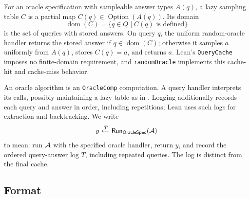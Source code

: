 \begin{definition}
\label{def:lazy_sampling_table}
\leanok
For an oracle specification with sampleable answer types \(A(q)\), a lazy sampling
table \(C\) is a partial map \(C(q)\in\operatorname{Option}(A(q))\). Its domain
\begin{equation*}
\operatorname{dom}(C)=\{q\in Q\mid C(q)\text{ is defined}\}
\end{equation*}
is the set of queries with stored answers. On query \(q\), the uniform random-oracle
handler returns the stored answer if \(q\in\operatorname{dom}(C)\); otherwise it
samples \(a\) uniformly from \(A(q)\), stores \(C(q)=a\), and returns \(a\).
Lean's \texttt{QueryCache} imposes no finite-domain requirement, and
\texttt{randomOracle} implements this cache-hit and cache-miss behavior.
\end{definition}

\begin{definition}
\label{def:oracle_run}
\leanok
An oracle algorithm is an \texttt{OracleComp} computation. A query handler
interprets its calls, possibly maintaining a lazy table as in
. Logging additionally records each query and answer
in order, including repetitions; Lean uses such logs for extraction and backtracking. We
write
\begin{equation*}
y\xleftarrow{T}\mathsf{Run}_{\mathsf{OracleSpec}}(\mathcal{A})
\end{equation*}
to mean: run \(\mathcal{A}\) with the specified oracle handler, return \(y\), and
record the ordered query-answer log \(T\), including repeated queries.
The log is distinct from the final cache.
\end{definition}

\subsection{Format}\label{sec:oracle_reductions_defs_format}

